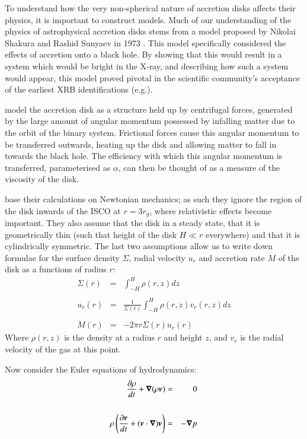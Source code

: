 \par To understand how the very non-spherical nature of accretion disks affects their physics, it is important to construct models.  Much of our understanding of the physics of astrophysical accretion disks stems from a model proposed by Nikolai Shakura and Rashid Sunyaev in 1973 \citep{Shakura_Disk}.  This model specifically considered the effects of accretion onto a black hole.  By showing that this would result in a system which would be bright in the X-ray, and describing how such a system would appear, this model proved pivotal in the scientific community's acceptance of the earliest XRB identifications (e.g.\citealp{Bolton_CygX1}).
\par \citeauthor{Shakura_Disk} model the accretion disk as a structure held up by centrifugal forces, generated by the large amount of angular momentum possessed by infalling matter due to the orbit of the binary system.  Frictional forces cause this angular momentum to be transferred outwards, heating up the disk and allowing matter to fall in towards the black hole.  The efficiency with which this angular momentum is transferred, parameterised as $\alpha$, can then be thought of as a measure of the viscosity of the disk.
\par \citeauthor{Shakura_Disk} base their calculations on Newtonian mechanics; as such they ignore the region of the disk inwards of the ISCO at $r=3r_g$, where relativistic effects become important.  They also assume that the disk in a steady state, that it is geometrically thin (such that height of the disk $H\ll r$ everywhere) and that it is cylindrically symmetric.  The last two assumptions allow us to write down formulae for the surface density $\Sigma$, radial velocity $u_r$ and accretion rate $\dot{M}$ of the disk as a functions of radius $r$:
\begin{eqnarray}
\Sigma(r)&=&\int_{-H}^H\rho(r,z) dz\label{eq:base1}\\\nonumber \\
u_r(r)&=&\frac{1}{\Sigma(r)}\int_{-H}^H\rho(r,z)v_r(r,z)dz\label{eq:base2}\\\nonumber \\
\dot{M}(r)&=&-2\pi r\Sigma(r) u_r(r)\label{eq:base3}
\end{eqnarray}
Where $\rho(r,z)$ is the density at a radius $r$ and height $z$, and $v_r$ is the radial velocity of the gas at this point.
\par Now consider the Euler equations of hydrodynamics:
\begin{eqnarray}
\frac{\partial\rho}{dt}+\bm{\nabla}(\rho\bm{v})&=&0\label{eq:consmass}\\\nonumber \\
\rho\left(\frac{\partial\bm{v}}{dt}+(\bm{v}\cdot\bm{\nabla}) \bm{v}\right)&=&-\bm{\nabla} p\label{eq:fma}
\end{eqnarray}
